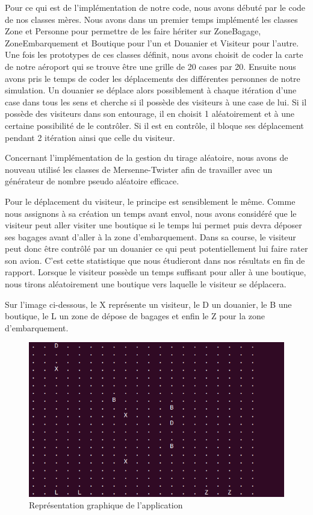\documentclass[12pt,french]{article} %
\begin{document}
Pour ce qui est de l'implémentation de notre code, nous avons débuté par le code de nos classes mères. Nous avons dans un premier temps implémenté les classes Zone et Personne pour permettre de les faire hériter sur ZoneBagage, ZoneEmbarquement et Boutique pour l'un et Douanier et Visiteur pour l'autre. Une fois les prototypes de ces classes définit, nous avons choisit de coder la carte de notre aéroport qui se trouve être une grille de 20 cases par 20. Ensuite nous avons pris le temps de coder les déplacements des différentes personnes de notre simulation. Un douanier se déplace alors possiblement à chaque itération d'une case dans tous les sens et cherche si il possède des visiteurs à une case de lui. Si il possède des visiteurs dans son entourage, il en choisit 1 aléatoirement et à une certaine possibilité de le contrôler. Si il est en contrôle, il bloque ses déplacement pendant 2 itération ainsi que celle du visiteur.
\newline

Concernant l'implémentation de la gestion du tirage aléatoire, nous avons de nouveau utilisé les classes de Mersenne-Twister afin de travailler avec un générateur de nombre pseudo aléatoire efficace.
\newline


Pour le déplacement du visiteur, le principe est sensiblement le même. Comme nous assignons à sa création un temps avant envol, nous avons considéré que le visiteur peut aller visiter une boutique si le temps lui permet puis devra déposer ses bagages avant d'aller à la zone d'embarquement. Dans sa course, le visiteur peut donc être contrôlé par un douanier ce qui peut potentiellement lui faire rater son avion. C'est cette statistique que nous étudieront dans nos résultats en fin de rapport. Lorsque le visiteur possède un temps suffisant pour aller à une boutique, nous tirons aléatoirement une boutique vers laquelle le visiteur se déplacera.
\newline



Sur l'image ci-dessous, le X représente un visiteur, le D un douanier, le B une boutique, le L un zone de dépose de bagages et enfin le Z pour la zone d'embarquement.


\begin{figure}[H]
	\centering
	\includegraphics[scale=0.5]{mp.png}
	\caption{Représentation graphique de l'application}    
\end{figure}
\end{document}
